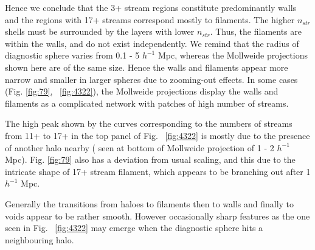 Hence we conclude that the 3+ stream regions constitute predominantly walls and the regions with 17+ streams correspond mostly to filaments. The higher $n_{str}$ shells must be surrounded by the layers with lower $n_{str}$. Thus, the filaments are within the walls, and do not exist independently.  
We remind that the radius of diagnostic sphere varies from 0.1 - 5 $h^{-1}$ Mpc, whereas the Mollweide projections shown here are of the same size. Hence the walls and filaments appear more narrow and smaller in larger spheres due to zooming-out effects. 
 In some cases (Fig. \ref{fig:79}, ~\ref{fig:4322}), the Mollweide projections display the walls  and filaments as a complicated network 
 with patches of high number of streams. 

The high peak shown by the curves corresponding to the numbers of streams from 11+ to 17+  in the top panel of Fig. ~\ref{fig:4322}
is mostly due to the presence of another halo nearby ( seen at bottom of Mollweide projection of 1 - 2 $h^{-1}$ Mpc). Fig. \ref{fig:79} also has a deviation from usual scaling, and this due to the intricate shape of 17+ stream filament, which appears to be branching out after 1 $h^{-1}$ Mpc. 

Generally the transitions from haloes to filaments then to walls and finally to voids appear to be rather smooth.
However occasionally sharp features as the one seen in Fig. ~\ref{fig:4322} may emerge when the diagnostic sphere hits a neighbouring halo.

 
